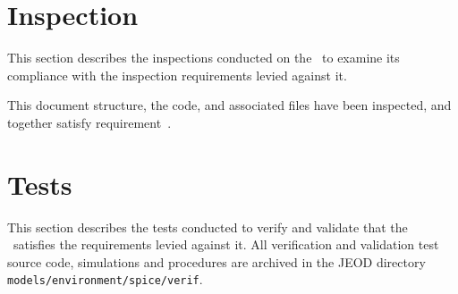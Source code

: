 \section{Inspection}\label{sec:inspect}
This section describes the inspections conducted on the \SpiceDesc\ to examine
its compliance with the inspection requirements levied against it.

\label{inspect:TLI}
This document structure, the code, and associated files have been inspected,
and together satisfy requirement~.


\section{Tests}\label{sec:tests}
This section describes the tests conducted to verify and validate
that the \SpiceDesc\ satisfies the requirements levied against it.
All verification and validation test source code, simulations and procedures
are archived in the JEOD directory
{\tt models/environment/spice/verif}.\relax


